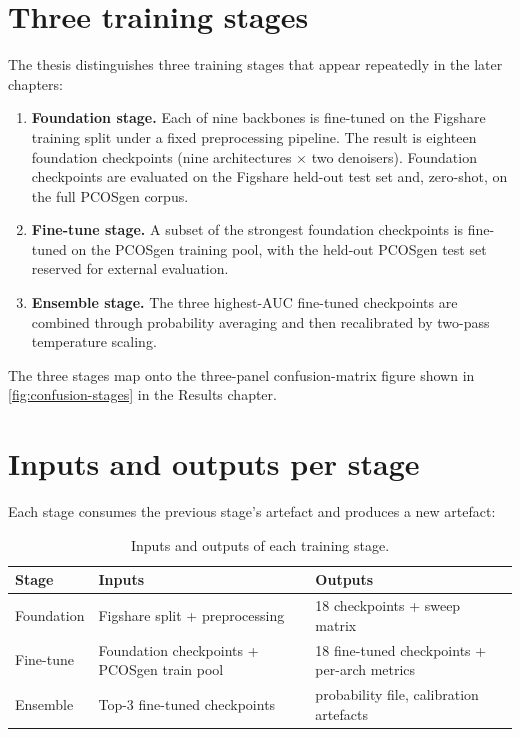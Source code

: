 \documentclass[../preamble.tex]{subfiles}
\begin{document}
\section{Three training stages}
\label{sec:method-stages}

The thesis distinguishes three training stages that appear repeatedly in the
later chapters:

\begin{enumerate}
  \item \textbf{Foundation stage.} Each of nine backbones is fine-tuned on the
        Figshare training split under a fixed preprocessing pipeline. The
        result is eighteen foundation checkpoints (nine architectures $\times$
        two denoisers). Foundation checkpoints are evaluated on the Figshare
        held-out test set and, zero-shot, on the full PCOSgen corpus.
  \item \textbf{Fine-tune stage.} A subset of the strongest foundation
        checkpoints is fine-tuned on the PCOSgen training pool, with the
        held-out PCOSgen test set reserved for external evaluation.
  \item \textbf{Ensemble stage.} The three highest-AUC fine-tuned checkpoints
        are combined through probability averaging and then recalibrated by
        two-pass temperature scaling.
\end{enumerate}

The three stages map onto the three-panel confusion-matrix figure shown in
\cref{fig:confusion-stages} in the Results chapter.

\section{Inputs and outputs per stage}
\label{sec:method-io}

Each stage consumes the previous stage's artefact and produces a new
artefact:

\begin{table}[htbp]
  \centering
  \small
  \caption{Inputs and outputs of each training stage.}
  \label{tab:method-io}
  \begin{tabular}{lll}
    \toprule
    \textbf{Stage} & \textbf{Inputs} & \textbf{Outputs} \\
    \midrule
    Foundation & Figshare split + preprocessing & 18 checkpoints + sweep matrix \\
    Fine-tune & Foundation checkpoints + PCOSgen train pool & 18 fine-tuned checkpoints + per-arch metrics \\
    Ensemble & Top-3 fine-tuned checkpoints & probability file, calibration artefacts \\
    \bottomrule
  \end{tabular}
\end{table}
\end{document}
